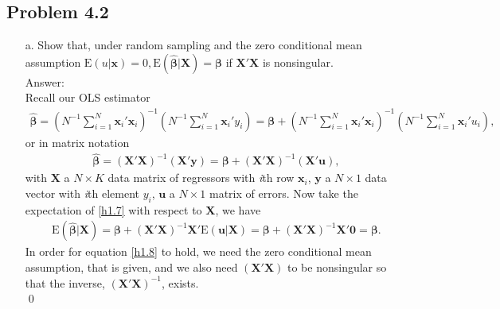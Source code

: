 \documentclass[10pt]{article}
\newcommand{\E}{\text{E}}
\begin{document}
\subsection*{Problem 4.2}
\begin{enumerate}
\item[a.] Show that, under random sampling and the zero conditional mean assumption $\E(u|\mathbf{x})=0,\E(\hat{\pmb{\beta}}|\mathbf{X})=\pmb{\beta}$ if $\mathbf{X}'\mathbf{X}$ is nonsingular.
\\ Answer:\\

Recall our OLS estimator
\begin{align*}
\hat{\pmb{\beta}}=\left(N^{-1}\sum_{i=1}^N\mathbf{x}_i'\mathbf{x}_i\right)^{-1}\left(N^{-1}\sum_{i=1}^N\mathbf{x}_i'y_i\right)=\pmb{\beta}+\left(N^{-1}\sum_{i=1}^N\mathbf{x}_i'\mathbf{x}_i\right)^{-1}\left(N^{-1}\sum_{i=1}^N\mathbf{x}_i'u_i\right),
\end{align*}
or in matrix notation
\begin{align}
\hat{\pmb{\beta}}=(\mathbf{X'X})^{-1}(\mathbf{X'y})=\pmb{\beta}+(\mathbf{X'X})^{-1}(\mathbf{X'u}), \label{h1.7}
\end{align}
with $\mathbf{X}$ a $N\times K$ data matrix of regressors with \textit{i}th row $\textbf{x}_i$, $\mathbf{y}$ a $N\times 1$ data vector with \textit{i}th element $y_i$, $\textbf{u}$ a $N\times 1$ matrix of errors. Now take the expectation of \eqref{h1.7} with respect to $\textbf{X}$, we have
\begin{align}
    \E(\hat{\pmb{\beta}}|\textbf{X})=\pmb{\beta}+(\mathbf{X'X})^{-1}\mathbf{X'}\E(\textbf{u}|\textbf{X})=\pmb{\beta}+(\mathbf{X'X})^{-1}\mathbf{X'}\textbf{0}=\pmb{\beta}. \label{h1.8}
\end{align}
In order for equation \eqref{h1.8} to hold, we need the zero conditional mean assumption, that is given, and we also need $(\mathbf{X'X})$ to be nonsingular so that the inverse, $(\mathbf{X'X})^{-1}$, exists.\\ \qed


\end{enumerate}
\end{document}
